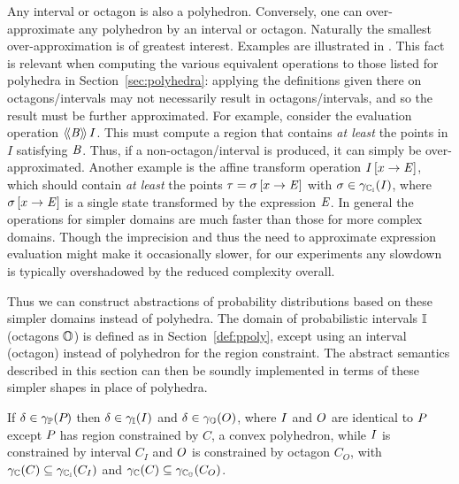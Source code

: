 Any interval or octagon is also a polyhedron. Conversely, one can
over-approximate any polyhedron by an interval or octagon. Naturally
the smallest over-approximation is of greatest interest.
Examples are illustrated in .  This fact is
relevant when computing the various equivalent operations to
those listed for polyhedra in Section~\ref{sec:polyhedra}: applying
the definitions given there on octagons/intervals may not necessarily
result in octagons/intervals, and so the result must be further
approximated.  For example, consider the evaluation operation $
\langle\!\langle{\mathit{B}}\rangle\!\rangle\,{I} $.  This must compute a region that contains \emph{at least}
the points in $ I $ satisfying $ \mathit{B} $.  Thus, if a non-octagon/interval
is produced, it can simply be over-approximated.  Another example is
the affine
transform operation $ I \left[ x \rightarrow \mathit{E} \right] $, which should
contain \emph{at least} the points $ \tau
= \sigma \left[ x \rightarrow \mathit{E} \right] $ with $ \sigma \in \gamma_{\mathbb{C_I}}(I) $, where
$ \sigma \left[ x \rightarrow \mathit{E} \right] $ is a single state transformed by the
expression $ \mathit{E} $. In general the operations for simpler domains
are much faster than those for more complex domains. Though the imprecision
and thus the need to approximate expression evaluation might
make it occasionally slower, for our experiments any slowdown is
typically overshadowed by the reduced complexity overall.

Thus we can construct abstractions of probability distributions based
on these simpler domains instead of polyhedra. The domain of
probabilistic intervals $ \mathbb{I} $ (octagons $ \mathbb{O} $)
is defined as in Section~\ref{def:ppoly}, except using an interval
(octagon) instead of polyhedron for the region constraint.  The
abstract semantics described in this section can then be soundly
implemented in terms of these simpler shapes in place of
polyhedra.


\begin{remark} If $ \delta \in \gamma_{\mathbb{P}}(P_{}) $ then
$ \delta \in \gamma_{\mathbb{I}}(I) $ and $ \delta \in \gamma_{\mathbb{O}}(O)
$, where $ I $ and $ O $ are identical to $ P_{} $
except $ P_{} $ has region constrained by $ C $, a convex
polyhedron, while $ I $ is constrained by interval $ C_I $ and
$ O $ is constrained by octagon $ C_O $, with
$ \gamma_{\mathbb{C}}(C) \subseteq \gamma_{\mathbb{C_I}}(C_I) $ and
$ \gamma_{\mathbb{C}}(C) \subseteq \gamma_{\mathbb{C_O}}(C_O) $.
\end{remark}

